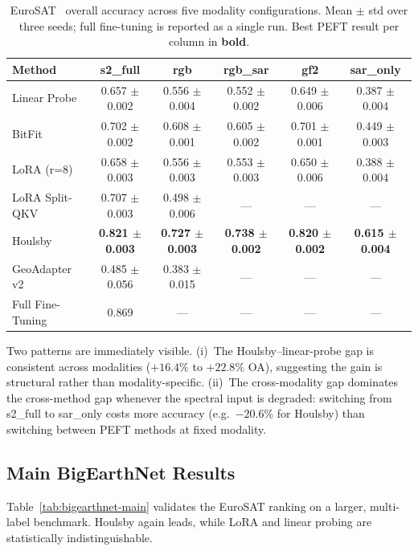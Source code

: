 \documentclass[11pt]{article}
\begin{document}
\begin{table}[t]
\centering
\small
\caption{EuroSAT~\cite{helber2019eurosat} overall accuracy across five modality configurations. Mean $\pm$ std over three seeds; full fine-tuning is reported as a single run. Best PEFT result per column in \textbf{bold}.}
\label{tab:eurosat-main}
\begin{tabular}{lccccc}
\toprule
Method & s2\_full & rgb & rgb\_sar & gf2 & sar\_only \\
\midrule
Linear Probe        & 0.657 $\pm$ 0.002 & 0.556 $\pm$ 0.004 & 0.552 $\pm$ 0.002 & 0.649 $\pm$ 0.006 & 0.387 $\pm$ 0.004 \\
BitFit              & 0.702 $\pm$ 0.002 & 0.608 $\pm$ 0.001 & 0.605 $\pm$ 0.002 & 0.701 $\pm$ 0.001 & 0.449 $\pm$ 0.003 \\
LoRA (r=8)          & 0.658 $\pm$ 0.003 & 0.556 $\pm$ 0.003 & 0.553 $\pm$ 0.003 & 0.650 $\pm$ 0.006 & 0.388 $\pm$ 0.004 \\
LoRA Split-QKV      & 0.707 $\pm$ 0.003 & 0.498 $\pm$ 0.006 & --- & --- & --- \\
Houlsby             & \textbf{0.821 $\pm$ 0.003} & \textbf{0.727 $\pm$ 0.003} & \textbf{0.738 $\pm$ 0.002} & \textbf{0.820 $\pm$ 0.002} & \textbf{0.615 $\pm$ 0.004} \\
GeoAdapter v2       & 0.485 $\pm$ 0.056 & 0.383 $\pm$ 0.015 & --- & --- & --- \\
\midrule
Full Fine-Tuning    & 0.869 & --- & --- & --- & --- \\
\bottomrule
\end{tabular}
\end{table}

Two patterns are immediately visible. (i)~The Houlsby--linear-probe gap is consistent across modalities ($+16.4\%$ to $+22.8\%$ OA), suggesting the gain is structural rather than modality-specific. (ii)~The cross-modality gap dominates the cross-method gap whenever the spectral input is degraded: switching from s2\_full to sar\_only costs more accuracy (e.g.~$-20.6\%$ for Houlsby) than switching between PEFT methods at fixed modality.

\subsection{Main BigEarthNet Results}
Table~\ref{tab:bigearthnet-main} validates the EuroSAT ranking on a larger, multi-label benchmark. Houlsby again leads, while LoRA and linear probing are statistically indistinguishable.
\end{document}
